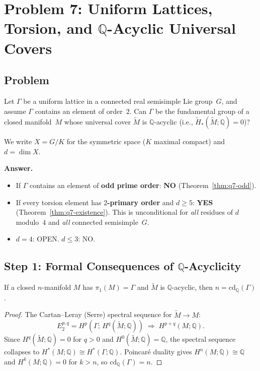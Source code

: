 \section{Problem 7: Uniform Lattices, Torsion, and $\mathbb Q$-Acyclic Universal Covers}\label{sec:q7}

\subsection*{Problem}
Let $\Gamma$ be a uniform lattice in a connected real semisimple Lie group~$G$, and assume $\Gamma$ contains an element of order~$2$. Can $\Gamma$ be the fundamental group of a closed manifold~$M$ whose universal cover $\widetilde M$ is $\mathbb Q$-acyclic (i.e., $\widetilde H_*(\widetilde M;\mathbb Q)=0$)?

We write $X=G/K$ for the symmetric space ($K$ maximal compact) and $d=\dim X$.

\medskip
\noindent\textbf{Answer.}
\begin{itemize}
\item If $\Gamma$ contains an element of \textbf{odd prime order}: \textbf{NO} (Theorem~\ref{thm:q7-odd}).
\item If every torsion element has \textbf{$2$-primary order}
  and $d\ge 5$: \textbf{YES} (Theorem~\ref{thm:q7-existence}).
  This is unconditional for \emph{all} residues of $d$ modulo~$4$
  and \emph{all} connected semisimple~$G$.
\item $d=4$: OPEN.  $d\le 3$: NO.
\end{itemize}

\subsection*{Step 1: Formal Consequences of $\mathbb Q$-Acyclicity}

\begin{lemma}\label{lem:q7-dim}
If a closed $n$-manifold $M$ has $\pi_1(M)=\Gamma$ and $\widetilde M$ is $\mathbb Q$-acyclic, then $n=\mathrm{cd}_{\mathbb Q}(\Gamma)$.
\end{lemma}

\begin{proof}
The Cartan--Leray (Serre) spectral sequence for $\widetilde M\to M$:
\[
E_2^{p,q}=H^p(\Gamma;\,H^q(\widetilde M;\mathbb Q))\;\Longrightarrow\;H^{p+q}(M;\mathbb Q).
\]
Since $H^q(\widetilde M;\mathbb Q)=0$ for $q>0$ and $H^0(\widetilde M;\mathbb Q)=\mathbb Q$,
the spectral sequence collapses to
$H^*(M;\mathbb Q)\cong H^*(\Gamma;\mathbb Q)$.
Poincar\'e duality gives $H^n(M;\mathbb Q)\cong\mathbb Q$ and $H^k(M;\mathbb Q)=0$ for $k>n$,
so $\mathrm{cd}_{\mathbb Q}(\Gamma)=n$.
\end{proof}

